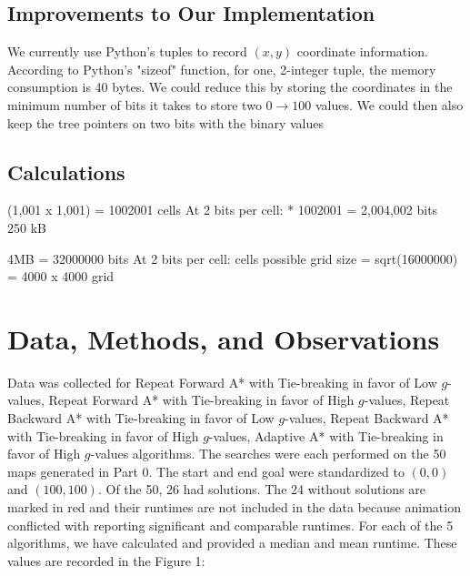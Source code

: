 \documentclass[a4paper,12pt]{article}
\begin{document}
\subsection{Improvements to Our Implementation}
We currently use Python's tuples to record $(x , y)$ coordinate information. According to Python's "sizeof" function, for one, 2-integer tuple, the memory consumption is 40 bytes. We could reduce this by storing the coordinates in the minimum number of bits it takes to store two $0 \rightarrow 100$ values. We could then also keep the tree pointers on two bits with the binary values 

\subsection{Calculations}
(1,001 x 1,001) = 1002001 cells \newline
At 2 bits per cell:  * 1002001  = 2,004,002 bits ~ 250 kB \newline \newline

4MB = 32000000 bits \newline
At 2 bits per cell:  cells possible \newline 
	grid size = sqrt(16000000) = 4000 x 4000 grid

\section{Data, Methods, and Observations}

Data was collected for Repeat Forward A* with Tie-breaking in favor of Low $g$-values, Repeat Forward A* with Tie-breaking in favor of High $g$-values,  Repeat Backward A* with Tie-breaking in favor of Low $g$-values, Repeat Backward A* with Tie-breaking in favor of High $g$-values, Adaptive A* with Tie-breaking in favor of High $g$-values algorithms. The searches were each performed on the 50 maps generated in Part 0. The start and end goal were standardized to $(0,0)$ and $(100,100)$. Of the 50, 26 had solutions. The 24 without solutions are marked in red and their runtimes are not included in the data because animation conflicted with reporting significant and comparable runtimes. For each of the 5 algorithms, we have calculated and provided a median and mean runtime. These values are recorded in the Figure 1:
\end{document}
